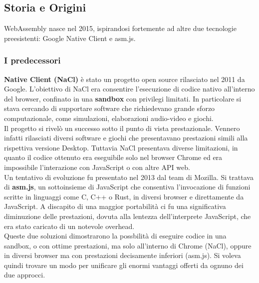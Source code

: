 \subsection{Storia e Origini}
WebAssembly nasce nel 2015, ispirandosi fortemente ad altre due tecnologie preesistenti: Google Native Client e asm.js.
\subsubsection{I predecessori}
\textbf{Native Client (NaCl)} è stato un progetto open source rilasciato nel 2011 da Google.
L'obiettivo di NaCl era consentire l'esecuzione di codice nativo all'interno del browser, confinato in una \textbf{sandbox} con privilegi limitati.
In particolare si stava cercando di supportare software che richiedevano grande sforzo computazionale, come simulazioni, elaborazioni audio-video e giochi.
\\Il progetto si rivelò un successo sotto il punto di vista prestazionale. Vennero infatti rilasciati diversi software e giochi che presentavano prestazioni simili alla rispettiva versione Desktop.
Tuttavia NaCl presentava diverse limitazioni, in quanto il codice ottenuto era eseguibile solo nel browser Chrome ed era impossibile l'interazione con JavaScript o con altre API web.
\\Un tentativo di evoluzione fu presentato nel 2013 dal team di Mozilla. Si trattava di \textbf{asm.js}, un sottoinsieme di JavaScript che consentiva l'invocazione di funzioni scritte in linguaggi come C, C++ o Rust, in diversi browser e direttamente da JavaScript.
A discapito di una maggior portabilità ci fu una significativa diminuzione delle prestazioni, dovuta alla lentezza dell'interprete JavaScript, che era stato caricato di un notevole overhead.
\\Queste due soluzioni dimostrarono la possbilità di eseguire codice in una sandbox, o con ottime prestazioni, ma solo all'interno di Chrome (NaCl), oppure in diversi browser ma con prestazioni decisamente inferiori (asm.js).
Si voleva quindi trovare un modo per unificare gli enormi vantaggi offerti da ognuno dei due approcci.\cite*{wasmBook}
